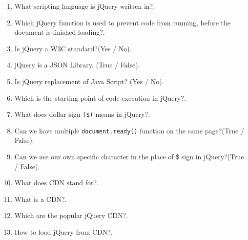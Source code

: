 \documentclass[11pt,a4paper]{article}
\begin{document}
\begin{enumerate}
\item What scripting language is jQuery written in?\underline{\hspace{3cm}}.

\item Which jQuery function is used to prevent code from running, before the document is finished loading?\underline{\hspace{3cm}}.

\item Is jQuery a W3C standard?(Yes / No)\underline{\hspace{3cm}}.

\item jQuery is a JSON Library. (True / False)\underline{\hspace{3cm}}.

\item Is jQuery replacement of Java Script? (Yes / No)\underline{\hspace{3cm}}.

\item Which is the starting point of code execution in jQuery?\underline{\hspace{3cm}}.

\item What does dollar sign \texttt{(\$)} means in jQuery?\underline{\hspace{3cm}}.

\item Can we have multiple \texttt{document.ready()} function on the same page?(True / False)\underline{\hspace{3cm}}.

\item Can we use our own specific character in the place of \$ sign in jQuery?(True / False)\underline{\hspace{3cm}}.

\item What does CDN stand for?\underline{\hspace{3cm}}.

\item What is a CDN?\underline{\hspace{3cm}}.

\item Which are the popular jQuery CDN?\underline{\hspace{3cm}}.

\item How to load jQuery from CDN?\underline{\hspace{3cm}}.


\end{enumerate}
\end{document}

